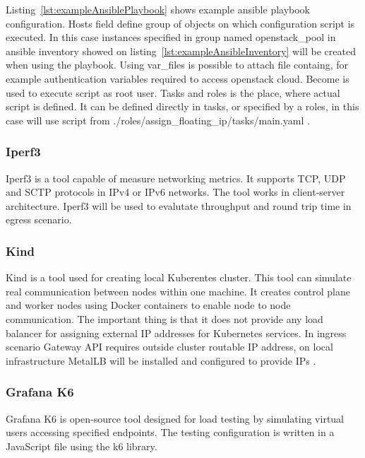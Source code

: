 Listing~\ref{lst:exampleAnsiblePlaybook} shows example ansible playbook configuration. Hosts field define group of objects on which configuration script is executed. In this case instances specified in group named openstack\_pool in ansible inventory showed on listing~\ref{lst:exampleAnsibleInventory} will be created when using the playbook. Using var\_files is possible to attach file containg, for example authentication variables required to access openstack cloud. Become is used to execute script as root user. Tasks and roles is the place, where actual script is defined. It can be defined directly in tasks, or specified by a roles, in this case will use script from ./roles/assign\_floating\_ip/tasks/main.yaml \cite{AnsiblePlaybook}.


\subsubsection{Iperf3}
\label{sec:iperf3}

Iperf3 is a tool capable of measure networking metrics. It supports TCP, UDP and SCTP protocols in IPv4 or IPv6 networks. The tool works in client-server architecture. Iperf3 will be used to evalutate throughput and round trip time in egress scenario.

\subsubsection{Kind}
\label{sec:kind}

Kind is a tool used for creating local Kuberentes cluster. This tool can simulate real communication between nodes within one machine. It creates control plane and worker nodes using Docker containers to enable node to node communication. The important thing is that it does not provide any load balancer for assigning external IP addresses for Kubernetes services. In ingress scenario Gateway API requires outside cluster routable IP address, on local infrastructure MetalLB will be installed and configured to provide IPs \cite{Kind}.

\subsubsection{Grafana K6}
\label{sec:grafana}

Grafana K6 is open-source tool designed for load testing by simulating virtual users accessing specified endpoints. The testing configuration is written in a JavaScript file using the k6 library.

